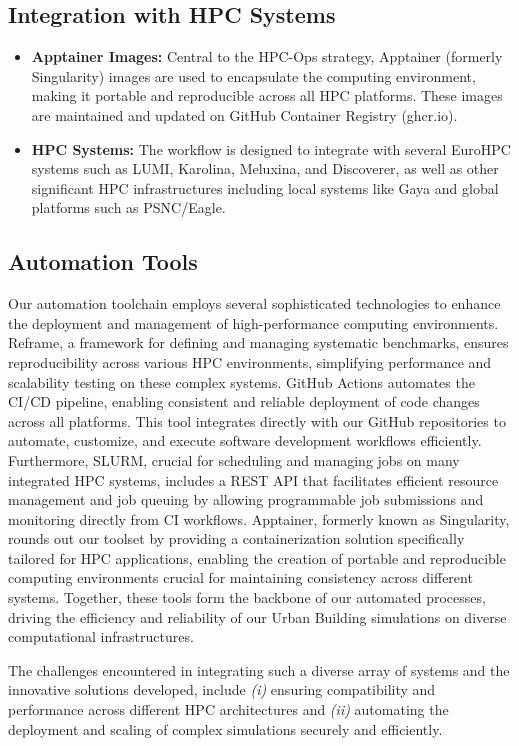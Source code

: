 \subsection{Integration with HPC Systems}
\begin{itemize}
    \item \textbf{Apptainer Images:} Central to the HPC-Ops strategy, Apptainer (formerly Singularity) images are used to encapsulate the computing environment, making it portable and reproducible across all HPC platforms. These images are maintained and updated on GitHub Container Registry (ghcr.io).
    \item \textbf{HPC Systems:} The workflow is designed to integrate with several EuroHPC systems such as LUMI, Karolina, Meluxina, and Discoverer, as well as other significant HPC infrastructures including local systems like Gaya and global platforms such as PSNC/Eagle.
\end{itemize}

\subsection{Automation Tools}
Our automation toolchain employs several sophisticated technologies to enhance the deployment and management of high-performance computing environments. Reframe, a framework for defining and managing systematic benchmarks, ensures reproducibility across various HPC environments, simplifying performance and scalability testing on these complex systems. GitHub Actions automates the CI/CD pipeline, enabling consistent and reliable deployment of code changes across all platforms. This tool integrates directly with our GitHub repositories to automate, customize, and execute software development workflows efficiently. Furthermore, SLURM, crucial for scheduling and managing jobs on many integrated HPC systems, includes a REST API that facilitates efficient resource management and job queuing by allowing programmable job submissions and monitoring directly from CI workflows. Apptainer, formerly known as Singularity, rounds out our toolset by providing a containerization solution specifically tailored for HPC applications, enabling the creation of portable and reproducible computing environments crucial for maintaining consistency across different systems. Together, these tools form the backbone of our automated processes, driving the efficiency and reliability of our Urban Building simulations on diverse computational infrastructures.


The challenges encountered in integrating such a diverse array of systems and the innovative solutions developed, include
\textit{(i)} ensuring compatibility and performance across different HPC architectures and \textit{(ii)} automating the deployment and scaling of complex simulations securely and efficiently.

